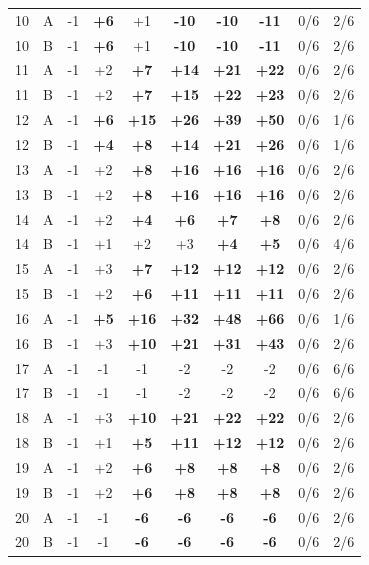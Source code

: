 \begin{table}[htbp]
\begin{tabular}{clcccccccc}
10 & A & -1 & \textbf{+6} & +1 & \textbf{-10} & \textbf{-10} & \textbf{-11} & 0/6 & 2/6 \\
10 & B & -1 & \textbf{+6} & +1 & \textbf{-10} & \textbf{-10} & \textbf{-11} & 0/6 & 2/6 \\
11 & A & -1 & +2 & \textbf{+7} & \textbf{+14} & \textbf{+21} & \textbf{+22} & 0/6 & 2/6 \\
11 & B & -1 & +2 & \textbf{+7} & \textbf{+15} & \textbf{+22} & \textbf{+23} & 0/6 & 2/6 \\
12 & A & -1 & \textbf{+6} & \textbf{+15} & \textbf{+26} & \textbf{+39} & \textbf{+50} & 0/6 & 1/6 \\
12 & B & -1 & \textbf{+4} & \textbf{+8} & \textbf{+14} & \textbf{+21} & \textbf{+26} & 0/6 & 1/6 \\
13 & A & -1 & +2 & \textbf{+8} & \textbf{+16} & \textbf{+16} & \textbf{+16} & 0/6 & 2/6 \\
13 & B & -1 & +2 & \textbf{+8} & \textbf{+16} & \textbf{+16} & \textbf{+16} & 0/6 & 2/6 \\
14 & A & -1 & +2 & \textbf{+4} & \textbf{+6} & \textbf{+7} & \textbf{+8} & 0/6 & 2/6 \\
14 & B & -1 & +1 & +2 & +3 & \textbf{+4} & \textbf{+5} & 0/6 & 4/6 \\
15 & A & -1 & +3 & \textbf{+7} & \textbf{+12} & \textbf{+12} & \textbf{+12} & 0/6 & 2/6 \\
15 & B & -1 & +2 & \textbf{+6} & \textbf{+11} & \textbf{+11} & \textbf{+11} & 0/6 & 2/6 \\
16 & A & -1 & \textbf{+5} & \textbf{+16} & \textbf{+32} & \textbf{+48} & \textbf{+66} & 0/6 & 1/6 \\
16 & B & -1 & +3 & \textbf{+10} & \textbf{+21} & \textbf{+31} & \textbf{+43} & 0/6 & 2/6 \\
17 & A & -1 & -1 & -1 & -2 & -2 & -2 & 0/6 & 6/6 \\
17 & B & -1 & -1 & -1 & -2 & -2 & -2 & 0/6 & 6/6 \\
18 & A & -1 & +3 & \textbf{+10} & \textbf{+21} & \textbf{+22} & \textbf{+22} & 0/6 & 2/6 \\
18 & B & -1 & +1 & \textbf{+5} & \textbf{+11} & \textbf{+12} & \textbf{+12} & 0/6 & 2/6 \\
19 & A & -1 & +2 & \textbf{+6} & \textbf{+8} & \textbf{+8} & \textbf{+8} & 0/6 & 2/6 \\
19 & B & -1 & +2 & \textbf{+6} & \textbf{+8} & \textbf{+8} & \textbf{+8} & 0/6 & 2/6 \\
20 & A & -1 & -1 & \textbf{-6} & \textbf{-6} & \textbf{-6} & \textbf{-6} & 0/6 & 2/6 \\
20 & B & -1 & -1 & \textbf{-6} & \textbf{-6} & \textbf{-6} & \textbf{-6} & 0/6 & 2/6 \\
\bottomrule
\end{tabular}
\end{table}
